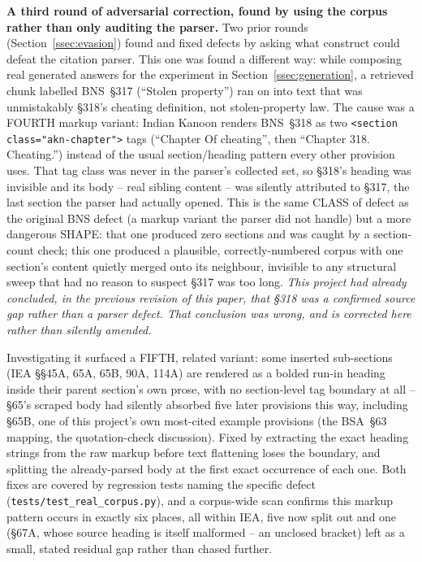\documentclass[conference]{IEEEtran}
\begin{document}
\textbf{A third round of adversarial correction, found by using the corpus
rather than only auditing the parser.} Two prior rounds (Section~\ref{ssec:evasion})
found and fixed defects by asking what construct could defeat the citation
parser. This one was found a different way: while composing real generated
answers for the experiment in Section~\ref{ssec:generation}, a retrieved
chunk labelled BNS~\S317 (``Stolen property'') ran on into text that was
unmistakably \S318's cheating definition, not stolen-property law. The cause
was a FOURTH markup variant: Indian Kanoon renders BNS~\S318 as two
\texttt{<section class="akn-chapter">} tags (``Chapter Of cheating'', then
``Chapter 318. Cheating.'') instead of the usual section/heading pattern every
other provision uses. That tag class was never in the parser's collected set,
so \S318's heading was invisible and its body -- real sibling content --
was silently attributed to \S317, the last section the parser had actually
opened. This is the same CLASS of defect as the original BNS defect (a markup
variant the parser did not handle) but a more dangerous SHAPE: that one
produced zero sections and was caught by a section-count check; this one
produced a plausible, correctly-numbered corpus with one section's content
quietly merged onto its neighbour, invisible to any structural sweep that had
no reason to suspect \S317 was too long. \emph{This project had already
concluded, in the previous revision of this paper, that \S318 was a confirmed
source gap rather than a parser defect. That conclusion was wrong, and is
corrected here rather than silently amended.}

Investigating it surfaced a FIFTH, related variant: some inserted
sub-sections (IEA \S\S45A, 65A, 65B, 90A, 114A) are rendered as a bolded
run-in heading inside their parent section's own prose, with no section-level
tag boundary at all -- \S65's scraped body had silently absorbed five later
provisions this way, including \S65B, one of this project's own most-cited
example provisions (the BSA~\S63 mapping, the quotation-check discussion).
Fixed by extracting the exact heading strings from the raw markup before text
flattening loses the boundary, and splitting the already-parsed body at the
first exact occurrence of each one. Both fixes are covered by regression
tests naming the specific defect (\texttt{tests/test\_real\_corpus.py}), and
a corpus-wide scan confirms this markup pattern occurs in exactly six places,
all within IEA, five now split out and one (\S67A, whose source heading is
itself malformed -- an unclosed bracket) left as a small, stated residual gap
rather than chased further.
\end{document}
